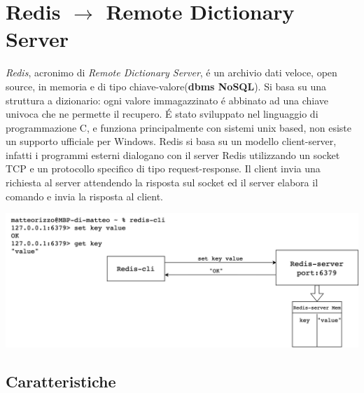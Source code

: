 \chapter{Redis $\to$ Remote Dictionary Server}

\emph{Redis}, acronimo di \emph{Remote Dictionary Server}, é un archivio dati veloce, open source, in memoria e di tipo chiave-valore(\textbf{dbms NoSQL}).
Si basa su una struttura a dizionario: ogni valore immagazzinato é abbinato ad una chiave univoca che ne permette il recupero.
É stato sviluppato nel linguaggio di programmazione C, e funziona principalmente con sistemi unix based, non esiste un supporto ufficiale
per Windows.
Redis si basa su un modello client-server, infatti i programmi esterni dialogano con il server Redis utilizzando un socket TCP e un protocollo specifico
di tipo request-response.
Il client invia una richiesta al server attendendo la risposta sul socket ed il server elabora il comando e
invia la risposta al client.

\includegraphics[width=1\textwidth]{img/redisClientServer}

\section{Caratteristiche}

